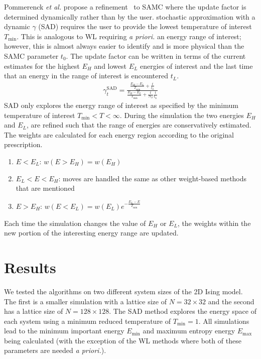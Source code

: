 Pommerenck \emph{et al.} propose a refinement~\cite{pommerenck2020stochastic} to SAMC
where the update factor is determined dynamically rather than by the user.
stochastic approximation with a dynamic $\gamma$ (SAD) requires the user to
provide the lowest temperature of interest $T_{\min}$. This is analogous to WL
requiring \emph{a priori.} an energy range of interest; however, this is almost always easier to
identify and is more physical than the SAMC parameter $t_0$. The update factor
can be written in terms of the current estimates for the highest $E_H$ and
lowest $E_L$ energies of interest and the last time that an energy in the range
of interest is encountered $t_L$.
\begin{align}
  \gamma_{t}^{\text{SAD}} =
     \frac{
       \frac{E_{H}-E_{L}}{T_{\text{min}}} + \frac{t}{t_L}
     }{
       \frac{E_{H}-E_{L}}{T_{\text{min}}} + \frac{t}{N_S}\frac{t}{t_L}
     }
\end{align}
SAD only explores the energy range of interest as specified by the minimum
temperature of interest $T_{\min} < T < \infty$. During the simulation the two
energies $E_H$ and $E_L$, are refined such that the range of energies are conservatively
estimated. The weights are calculated for each energy region according to the original
prescription.
\begin{enumerate}
\item {$E < E_L$:} $w(E>E_H) = w(E_H)$
\item {$E_L < E < E_H$:} moves are handled the same as other weight-based
methods that are mentioned
\item {$E > E_H$:} $w(E<E_L) = w(E_L)e^{-\frac{E_L-E}{T_{\min}}}$
\end{enumerate}
Each time the simulation changes the value of $E_H$ or $E_L$, the weights
within the new portion of the interesting energy range are updated.

\section{Results}
We tested the algorithms on two different system sizes of the 2D Ising model.  The first is a smaller
simulation with a lattice size of $N = 32 \times 32$ and the second has a lattice size of $N = 128 \times 128$. The SAD method explores the energy
space of each system using a minimum reduced temperature of $T_{\text{min}} = 1$. All simulations lead to the minimum important energy $E_{\min}$
and maximum entropy energy $E_{\max}$ being calculated (with the exception of
the WL methods where both of these parameters are needed \emph{a priori.}).

